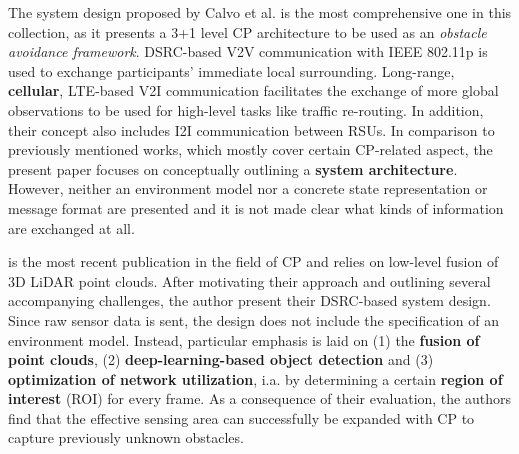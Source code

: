The system design proposed by Calvo et al. \cite{Calvo2017} is the most comprehensive one in this collection, as it presents a 3+1 level CP architecture to be used as an \textit{obstacle avoidance framework}. DSRC-based V2V communication with IEEE 802.11p is used to exchange participants' immediate local surrounding. Long-range, \textbf{cellular}, LTE-based V2I communication facilitates the exchange of more global observations to be used for high-level tasks like traffic re-routing. In addition, their concept also includes I2I communication between RSUs. In comparison to previously mentioned works, which mostly cover certain CP-related aspect, the present paper focuses on conceptually outlining a \textbf{system architecture}. However, neither an environment model nor a concrete state representation or message format are presented and it is not made clear what kinds of information are exchanged at all. 
\par
\bigskip

\cite{Chen2019} is the most recent publication in the field of CP and relies on low-level fusion of 3D LiDAR point clouds. After motivating their approach and outlining several accompanying challenges, the author present their DSRC-based system design. Since raw sensor data is sent, the design does not include the specification of an environment model. Instead, particular emphasis is laid on (1) the \textbf{fusion of point clouds}, (2)\textbf{ deep-learning-based object detection} and (3) \textbf{optimization of network utilization}, i.a. by determining a certain \textbf{region of interest} (ROI) for every frame. As a consequence of their evaluation, the authors find that the effective sensing area can successfully be expanded with CP to capture previously unknown obstacles. 
\par
\bigskip

